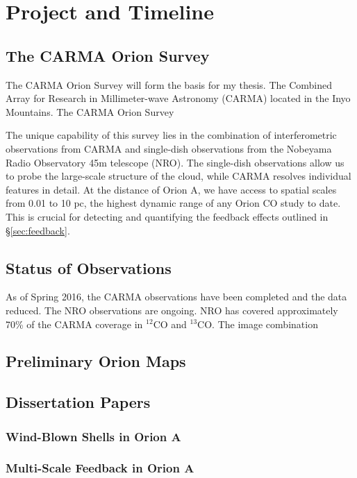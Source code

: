 \section{Project and Timeline}\label{sec:project}
    \subsection{The CARMA Orion Survey}\label{sec:carma}
    The CARMA Orion Survey will form the basis for my thesis. The Combined Array for Research in Millimeter-wave Astronomy (CARMA) located in the Inyo Mountains. The CARMA Orion Survey %
    
    The unique capability of this survey lies in the combination of interferometric observations from CARMA and single-dish observations from the Nobeyama Radio Observatory 45m telescope (NRO). The single-dish observations allow us to probe the large-scale structure of the cloud, while CARMA resolves individual features in detail. At the distance of Orion A, we have access to spatial scales from 0.01 to 10 pc, the highest dynamic range of any Orion CO study to date. This is crucial for detecting and quantifying the feedback effects outlined in \S\ref{sec:feedback}.
    \subsection{Status of Observations}
    As of Spring 2016, the CARMA observations have been completed and the data reduced. The NRO observations are ongoing. NRO has covered approximately 70\% of the CARMA coverage in $^{12}$CO and $^{13}$CO. The image combination 
    \subsection{Preliminary Orion Maps}\label{sec:maps}
    
    
    \subsection{Dissertation Papers}\label{sec:papers}
        \subsubsection{Wind-Blown Shells in Orion A}\label{sec:paper1}
        \subsubsection{Multi-Scale Feedback in Orion A}\label{sec:paper2}
